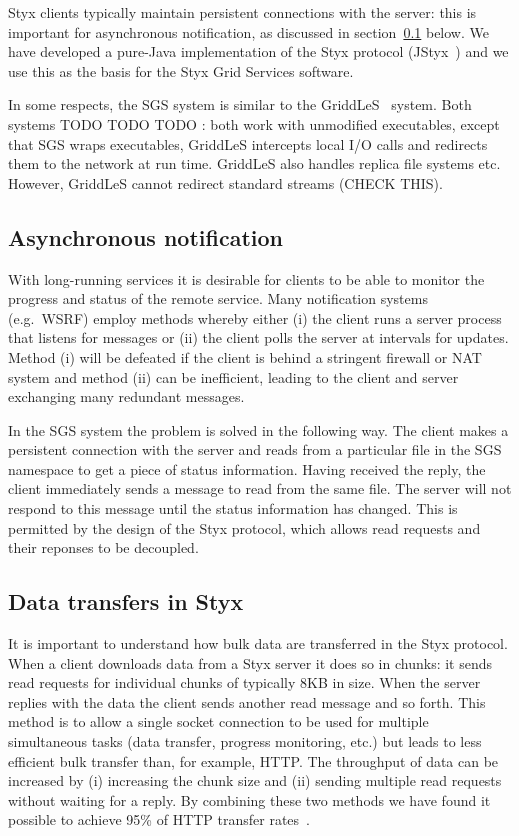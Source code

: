\documentclass[a4paper]{article}
\begin{document}
Styx clients typically maintain persistent connections with the server: this is important for asynchronous notification, as discussed in section~\ref{sec:notification} below.  We have developed a pure-Java implementation of the Styx protocol (JStyx~\cite{JStyx}) and we use this as the basis for the Styx Grid Services software.

In some respects, the SGS system is similar to the GriddLeS~\cite{abramson:2004} system.  Both systems TODO TODO TODO : both work with unmodified executables, except that SGS wraps executables, GriddLeS intercepts local I/O calls and redirects them to the network at run time.  GriddLeS also handles replica file systems etc.  However, GriddLeS cannot redirect standard streams (CHECK THIS).

\subsection{Asynchronous notification}\label{sec:notification}
With long-running services it is desirable for clients to be able to monitor the progress and status of the remote service.  Many notification systems (e.g.\ WSRF) employ methods whereby either (i) the client runs a server process that listens for messages or (ii) the client polls the server at intervals for updates.  Method (i) will be defeated if the client is behind a stringent firewall or NAT system and method (ii) can be inefficient, leading to the client and server exchanging many redundant messages.

In the SGS system the problem is solved in the following way.  The client makes a persistent connection with the server and reads from a particular file in the SGS namespace to get a piece of status information.  Having received the reply, the client immediately sends a message to read from the same file.  The server will not respond to this message until the status information has changed.  This is permitted by the design of the Styx protocol, which allows read requests and their reponses to be decoupled.

\subsection{Data transfers in Styx}\label{sec:datatransfer}
It is important to understand how bulk data are transferred in the Styx protocol.  When a client downloads data from a Styx server it does so in chunks: it sends read requests for individual chunks of typically 8KB in size.  When the server replies with the data the client sends another read message and so forth.  This method is to allow a single socket connection to be used for multiple simultaneous tasks (data transfer, progress monitoring, etc.) but leads to less efficient bulk transfer than, for example, HTTP.  The throughput of data can be increased by (i) increasing the chunk size and (ii) sending multiple read requests without waiting for a reply.  By combining these two methods we have found it possible to achieve 95\% of HTTP transfer rates~\cite{blower:2004}.
\end{document}
